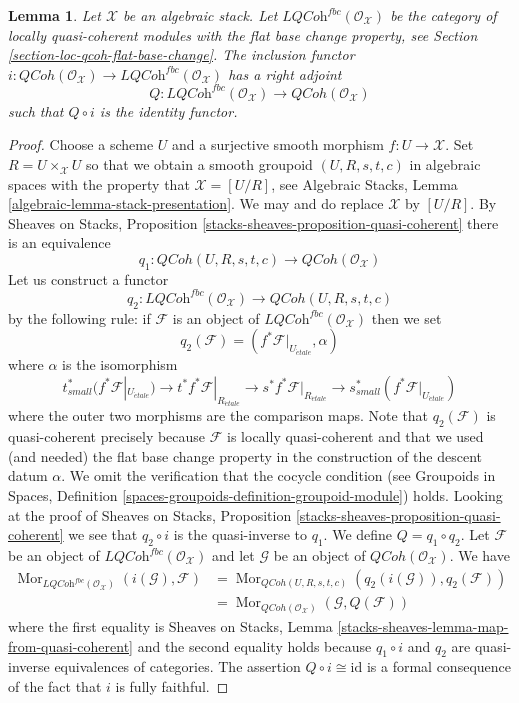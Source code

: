 \documentclass{stacks-project}
\theoremstyle{plain}
\newtheorem{lemma}[subsection]{Lemma}
\theoremstyle{definition}
\theoremstyle{remark}
\numberwithin{equation}{subsection}
\def\Mor{\mathop{\mathrm{Mor}}\nolimits}
\def\etale{{\acute{e}tale}}
\def\QCoh{\mathit{QCoh}}
\begin{document}
\begin{lemma}
\label{lemma-adjoint}
Let $\mathcal{X}$ be an algebraic stack. Let
$\textit{LQCoh}^{fbc}(\mathcal{O}_\mathcal{X})$
be the category of locally quasi-coherent modules with the
flat base change property, see
Section \ref{section-loc-qcoh-flat-base-change}.
The inclusion functor
$i : \QCoh(\mathcal{O}_\mathcal{X}) \to
\textit{LQCoh}^{fbc}(\mathcal{O}_\mathcal{X})$
has a right adjoint
$$
Q : \textit{LQCoh}^{fbc}(\mathcal{O}_\mathcal{X}) \to
\QCoh(\mathcal{O}_\mathcal{X})
$$
such that $Q \circ i$ is the identity functor.
\end{lemma}

\begin{proof}
Choose a scheme $U$ and a surjective smooth morphism $f : U \to \mathcal{X}$.
Set $R = U \times_\mathcal{X} U$ so that we obtain a smooth groupoid
$(U, R, s, t, c)$ in algebraic spaces with the property that
$\mathcal{X} = [U/R]$, see
Algebraic Stacks, Lemma \ref{algebraic-lemma-stack-presentation}.
We may and do replace $\mathcal{X}$ by $[U/R]$. By
Sheaves on Stacks, Proposition \ref{stacks-sheaves-proposition-quasi-coherent}
there is an equivalence
$$
q_1 :
\QCoh(U, R, s, t, c)
\longrightarrow
\QCoh(\mathcal{O}_\mathcal{X})
$$
Let us construct a functor
$$
q_2 :
\textit{LQCoh}^{fbc}(\mathcal{O}_\mathcal{X})
\longrightarrow
\QCoh(U, R, s, t, c)
$$
by the following rule: if $\mathcal{F}$ is an object of
$\textit{LQCoh}^{fbc}(\mathcal{O}_\mathcal{X})$ then we set
$$
q_2(\mathcal{F}) = (f^*\mathcal{F}|_{U_\etale}, \alpha)
$$
where $\alpha$ is the isomorphism
$$
t_{small}^*(f^*\mathcal{F}|_{U_\etale})
\to
t^*f^*\mathcal{F}|_{R_\etale} \to
s^*f^*\mathcal{F}|_{R_\etale} \to
s_{small}^*(f^*\mathcal{F}|_{U_\etale})
$$
where the outer two morphisms are the comparison maps. Note that
$q_2(\mathcal{F})$ is quasi-coherent precisely because $\mathcal{F}$ is
locally quasi-coherent and that we used (and needed)
the flat base change property in the construction of
the descent datum $\alpha$. We omit the
verification that the cocycle condition (see
Groupoids in Spaces, Definition
\ref{spaces-groupoids-definition-groupoid-module})
holds. Looking at the proof of
Sheaves on Stacks, Proposition \ref{stacks-sheaves-proposition-quasi-coherent}
we see that $q_2 \circ i$ is the quasi-inverse to $q_1$.
We define $Q = q_1 \circ q_2$.
Let $\mathcal{F}$ be an object of
$\textit{LQCoh}^{fbc}(\mathcal{O}_\mathcal{X})$ and
let $\mathcal{G}$ be an object of $\QCoh(\mathcal{O}_\mathcal{X})$.
We have
\begin{align*}
\Mor_{\textit{LQCoh}^{fbc}(\mathcal{O}_\mathcal{X})}
(i(\mathcal{G}), \mathcal{F})
& =
\Mor_{\QCoh(U, R, s, t, c)}(q_2(i(\mathcal{G})), q_2(\mathcal{F})) \\
& =
\Mor_{\QCoh(\mathcal{O}_\mathcal{X})}(\mathcal{G}, Q(\mathcal{F}))
\end{align*}
where the first equality is
Sheaves on Stacks, Lemma \ref{stacks-sheaves-lemma-map-from-quasi-coherent}
and the second equality holds because $q_1 \circ i$ and $q_2$ are quasi-inverse
equivalences of categories. The assertion $Q \circ i \cong \text{id}$
is a formal consequence of the fact that $i$ is fully faithful.
\end{proof}
\end{document}
